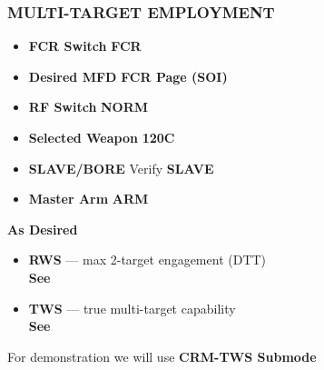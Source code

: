\subsubsection{MULTI-TARGET EMPLOYMENT}
\label{subsec:aim120:multi}

\begin{checklistenumerate}
    \blueitem[Prerequisites]
    \begin{itemize}
        \item \textbf{FCR Switch} \dotfill \textbf{FCR}
        \item \textbf{Desired MFD} \dotfill \textbf{FCR Page (SOI)}
        \item \textbf{RF Switch} \dotfill \textbf{NORM}
        \item \textbf{Selected Weapon} \dotfill \textbf{120C}
        \item \textbf{SLAVE/BORE} \dotfill Verify \textbf{SLAVE}
        \item \textbf{Master Arm} \dotfill \textbf{ARM}
    \end{itemize}
     \textbf{As Desired}
    \begin{itemize}
        \item \textbf{RWS} --- max 2-target engagement (DTT) \\
        \textbf{See }
        \item \textbf{TWS} --- true multi-target capability \\
        \textbf{See }
    \end{itemize}
    For demonstration we will use \textbf{CRM-TWS Submode} 
    \marginpar{
        \captionsetup{type=figure}
        \begin{tikzpicture}[figstyle]


\end{tikzpicture}}
\end{checklistenumerate}
